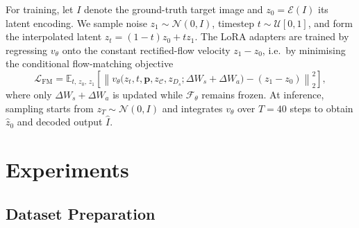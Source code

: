 For training, let $I$ denote the ground-truth target image and $z_0 = \mathcal{E}(I)$ its latent encoding. We sample noise $z_1 \sim \mathcal{N}(0, I)$, timestep $t \sim \mathcal{U}[0, 1]$, and form the interpolated latent $z_t = (1 - t) z_0 + t z_1$. The LoRA adapters are trained by regressing $v_\theta$ onto the constant rectified-flow velocity $z_1 - z_0$, i.e.\ by minimising the conditional flow-matching objective
\begin{equation}
  \mathcal{L}_{\text{FM}} = \mathbb{E}_{t,\, z_0,\, z_1} \left[ \left\lVert v_\theta\bigl(z_t, t, \mathbf{p}, z_{\mathcal{C}}, z_{D_s}; \Delta W_s + \Delta W_a\bigr) - (z_1 - z_0) \right\rVert_2^2 \right],
\end{equation}
where only $\Delta W_s + \Delta W_a$ is updated while $\mathcal{F}_\theta$ remains frozen. At inference, sampling starts from $z_T \sim \mathcal{N}(0, I)$ and integrates $v_\theta$ over $T{=}40$ steps to obtain $\hat{z}_0$ and decoded output $\hat{I}$.

\section{Experiments}

\subsection{Dataset Preparation}
\label{sec:dataset-prep}

